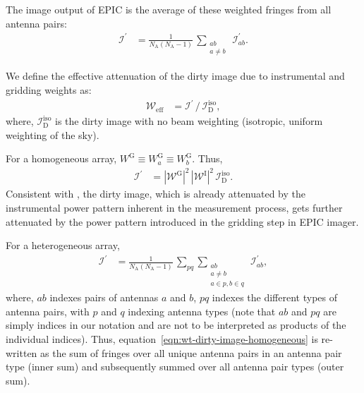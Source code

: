 \documentclass[a4paper,fleqn,usenatbib]{mnras}
\newcommand{\Nant}{N_\textrm{A}}
\begin{document}
The image output of EPIC is the average of these weighted fringes from all antenna pairs:
\begin{align}\label{eqn:wt-dirty-image-EPIC}
  \mathcal{I}^\prime &= \frac{1}{\Nant(\Nant-1)}\,\sum_{\substack{ab\\a\ne b}}\,\mathcal{I}^\prime_{ab}.
\end{align}

We define the effective attenuation of the dirty image due to instrumental and gridding weights as:
\begin{align}\label{eqn:effective-weighting}
  \mathcal{W}_\textrm{eff} &= \mathcal{I}^\prime\, / \,\mathcal{I}_\textrm{D}^\textrm{iso},
\end{align}
where, $\mathcal{I}_\textrm{D}^\textrm{iso}$ is the dirty image with no beam weighting (isotropic, uniform weighting of the sky).

For a homogeneous array, $W^\textrm{G} \equiv W^\textrm{G}_a \equiv W^\textrm{G}_b$. Thus,  
\begin{align}\label{eqn:wt-dirty-image-homogeneous}
  \mathcal{I}^\prime &= \left|\mathcal{W}^\textrm{G}\right|^2\,\left|\mathcal{W}^\textrm{I}\right|^2\,\mathcal{I}_\textrm{D}^\textrm{iso}.
\end{align}
Consistent with \citet{mor09}, the dirty image, which is already attenuated by the instrumental power pattern inherent in the measurement process, gets further attenuated by the power pattern introduced in the gridding step in EPIC imager.

For a heterogeneous array, 
\begin{align}\label{eqn:wt-dirty-image-EPIC-decomp}
  \mathcal{I}^\prime &= \frac{1}{\Nant(\Nant-1)}\,\sum_{pq}\sum_{\substack{ab\\a\ne b\\a\in p, b\in q}}\,\mathcal{I}^\prime_{ab},
\end{align}
where, $ab$ indexes pairs of antennas $a$ and $b$, $pq$ indexes the different types of antenna pairs, with $p$ and $q$ indexing antenna types (note that $ab$ and $pq$ are simply indices in our notation and are not to be interpreted as products of the individual indices). Thus, equation~\ref{eqn:wt-dirty-image-homogeneous} is re-written as the sum of fringes over all unique antenna pairs in an antenna pair type (inner sum) and subsequently summed over all antenna pair types (outer sum). 
\end{document}
